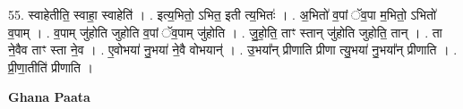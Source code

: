 \documentclass[17pt]{extarticle}
\begin{document}
55. स्वाहेतीति॒ स्वाहा॒ स्वाहेति॑ । . इत्य॒भितो॒ ऽभित॒ इती त्य॒भितः॑ । . अ॒भितो॑ व॒पां ॅव॒पा म॒भितो॒ ऽभितो॑ व॒पाम् । . व॒पाम् जु॑होति जुहोति व॒पां ॅव॒पाम् जु॑होति । . जु॒हो॒ति॒ ताꣳ स्तान् जु॑होति जुहोति॒ तान् । . ता ने॒वैव ताꣳ स्ता ने॒व । . ए॒वोभया॑ नु॒भया॑ ने॒वै वोभयान्॑ । . उ॒भया᳚न् प्रीणाति प्रीणा त्यु॒भया॑ नु॒भया᳚न् प्रीणाति । . प्री॒णा॒तीति॑ प्रीणाति । \newline

\textbf{Ghana Paata } \newline
\end{document}
